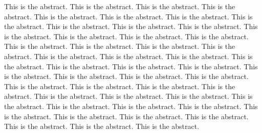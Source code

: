 This is the abstract.
This is the abstract.
This is the abstract.
This is the abstract.
This is the abstract.
This is the abstract.
This is the abstract.
This is the abstract.
This is the abstract.
This is the abstract.
This is the abstract.
This is the abstract.
This is the abstract.
This is the abstract.
This is the abstract.
This is the abstract.
This is the abstract.
This is the abstract.
This is the abstract.
This is the abstract.
This is the abstract.
This is the abstract.
This is the abstract.
This is the abstract.
This is the abstract.
This is the abstract.
This is the abstract.
This is the abstract.
This is the abstract.
This is the abstract.
This is the abstract.
This is the abstract.
This is the abstract.
This is the abstract.
This is the abstract.
This is the abstract.
This is the abstract.
This is the abstract.
This is the abstract.
This is the abstract.
This is the abstract.
This is the abstract.
This is the abstract.
This is the abstract.
This is the abstract.
This is the abstract.
This is the abstract.
This is the abstract.
